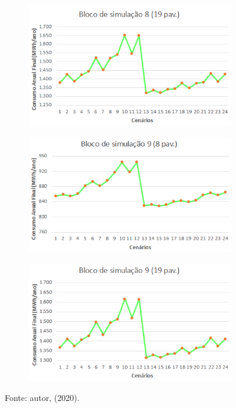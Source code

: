 \begin{figure}[H]
\begin{subfigure}[b]{0.49\textwidth}
    \end{subfigure}
    \begin{subfigure}[b]{0.49\textwidth}
        \includegraphics[width=\textwidth]{figures/result/fig38-bloco8.png}
    \end{subfigure}
    \begin{subfigure}[b]{0.49\textwidth}
        \includegraphics[width=\textwidth]{figures/result/fig39-bloco9.png}
    \end{subfigure}
    \begin{subfigure}[b]{0.49\textwidth}
        \includegraphics[width=\textwidth]{figures/result/fig40-bloco9.png}
    \end{subfigure}
    \begin{flushleft}
        \par \small Fonte: autor, (2020).
    \end{flushleft}
    \label{fig:figure28}
\end{figure}